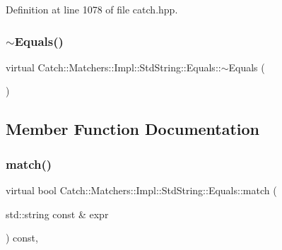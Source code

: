 Definition at line 1078 of file catch.\+hpp.

\hypertarget{struct_catch_1_1_matchers_1_1_impl_1_1_std_string_1_1_equals_ad34af04f636ec84d7c613ead32f20c3f}{}\label{struct_catch_1_1_matchers_1_1_impl_1_1_std_string_1_1_equals_ad34af04f636ec84d7c613ead32f20c3f} 
\subsubsection{\texorpdfstring{$\sim$\+Equals()}{~Equals()}}
{\footnotesize\ttfamily virtual Catch\+::\+Matchers\+::\+Impl\+::\+Std\+String\+::\+Equals\+::$\sim$\+Equals (\begin{DoxyParamCaption}{ }\end{DoxyParamCaption})\hspace{0.3cm}{\ttfamily [virtual]}}



\subsection{Member Function Documentation}
\hypertarget{struct_catch_1_1_matchers_1_1_impl_1_1_std_string_1_1_equals_abf0a94b4e66dbd586268d9983f867e68}{}\label{struct_catch_1_1_matchers_1_1_impl_1_1_std_string_1_1_equals_abf0a94b4e66dbd586268d9983f867e68} 
\subsubsection{\texorpdfstring{match()}{match()}}
{\footnotesize\ttfamily virtual bool Catch\+::\+Matchers\+::\+Impl\+::\+Std\+String\+::\+Equals\+::match (\begin{DoxyParamCaption}\item[{std\+::string const \&}]{expr }\end{DoxyParamCaption}) const\hspace{0.3cm}{\ttfamily [inline]}, {\ttfamily [virtual]}}



